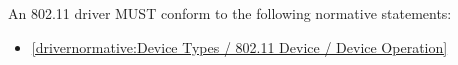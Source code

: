 \label{sec:Conformance / Driver Conformance / 802.11 Driver Conformance}

An 802.11 driver MUST conform to the following normative statements:

\begin{itemize}
\item \ref{drivernormative:Device Types / 802.11 Device / Device Operation}
\end{itemize}
